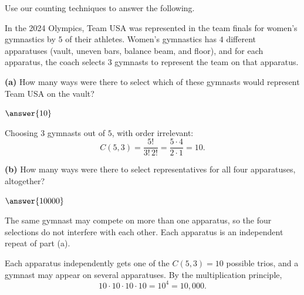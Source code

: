 \documentclass[12pt]{ximera}
\begin{document}
\begin{problem}
Use our counting techniques to answer the following.

In the 2024 Olympics, Team USA was represented in the team finals for women's
gymnastics by $5$ of their athletes. Women's gymnastics has $4$ different apparatuses
(vault, uneven bars, balance beam, and floor), and for each apparatus, the coach
selects $3$ gymnasts to represent the team on that apparatus.

\begin{prompt}
\textbf{(a)} How many ways were there to select which of these gymnasts would
represent Team USA on the vault?

$\answer{10}$

\begin{feedback}
Choosing $3$ gymnasts out of $5$, with order irrelevant:
\[
C(5,3)=\frac{5!}{3!\,2!}=\frac{5\cdot 4}{2\cdot 1}=10.
\]
\end{feedback}
\end{prompt}

\begin{prompt}
\textbf{(b)} How many ways were there to select representatives for all four
apparatuses, altogether?

$\answer{10000}$

\begin{hint}
The same gymnast may compete on more than one apparatus, so the four selections do
not interfere with each other. Each apparatus is an independent repeat of part (a).
\end{hint}

\begin{feedback}
Each apparatus independently gets one of the $C(5,3)=10$ possible trios, and a
gymnast may appear on several apparatuses. By the multiplication principle,
\[
10 \cdot 10 \cdot 10 \cdot 10 = 10^4 = 10{,}000.
\]
\end{feedback}
\end{prompt}
\end{problem}
\end{document}
